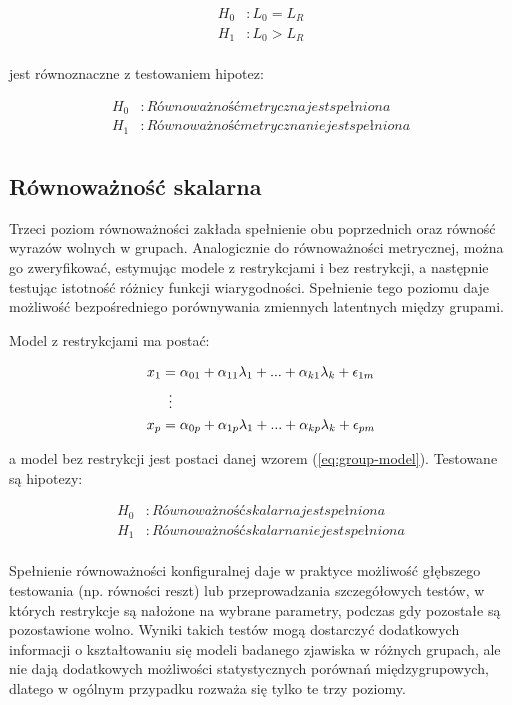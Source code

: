 \documentclass[12pt]{article}
\begin{document}
\begin{align*} 
H_0&: L_0 = L_R \\
H_1&: L_0 > L_R \\
\end{align*}

jest równoznaczne z testowaniem hipotez:

\begin{align*} 
H_0&: Równoważność metryczna jest spełniona \\
H_1&: Równoważność metryczna nie jest spełniona \\
\end{align*}

\hypertarget{ruxf3wnowaux17cnoux15bux107-skalarna}{%
\subsection{Równoważność skalarna}\label{ruxf3wnowaux17cnoux15bux107-skalarna}}

Trzeci poziom równoważności zakłada spełnienie obu poprzednich oraz równość wyrazów wolnych w grupach. Analogicznie do równoważności metrycznej, można go zweryfikować, estymując modele z restrykcjami i bez restrykcji, a następnie testując istotność różnicy funkcji wiarygodności. Spełnienie tego poziomu daje możliwość bezpośredniego porównywania zmiennych latentnych między grupami.

Model z restrykcjami ma postać:

\begin{align} 
\label{eq:restricted-intercepts}
\begin{split}
x_1 &= \alpha_{01} + \alpha_{11} \lambda_1 + ... + \alpha_{k1} \lambda_k + \epsilon_{1m}\\
& \vdotswithin{=} \\
x_p &= \alpha_{0p} + \alpha_{1p} \lambda_1 + ... + \alpha_{kp} \lambda_k + \epsilon_{pm}\\
\end{split}
\end{align}

a model bez restrykcji jest postaci danej wzorem (\ref{eq:group-model}). Testowane są hipotezy:

\begin{align*} 
H_0&: Równoważność skalarna jest spełniona \\
H_1&: Równoważność skalarna nie jest spełniona \\
\end{align*}

Spełnienie równoważności konfiguralnej daje w praktyce możliwość głębszego testowania (np. równości reszt) lub przeprowadzania szczegółowych testów, w których restrykcje są nałożone na wybrane parametry, podczas gdy pozostałe są pozostawione wolno. Wyniki takich testów mogą dostarczyć dodatkowych informacji o kształtowaniu się modeli badanego zjawiska w różnych grupach, ale nie dają dodatkowych możliwości statystycznych porównań międzygrupowych, dlatego w ogólnym przypadku rozważa się tylko te trzy poziomy.
\end{document}

